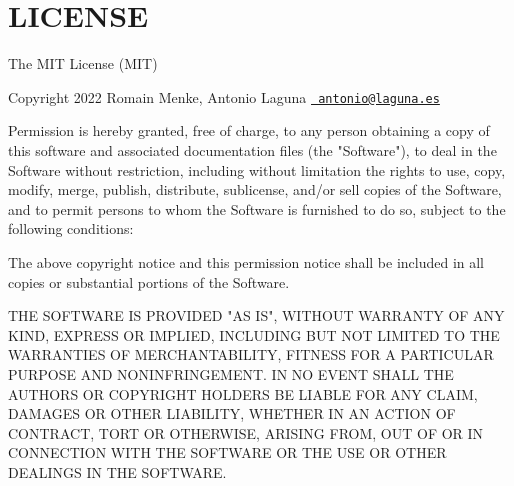 \chapter{LICENSE}
\hypertarget{md_node__modules_2_0dcsstools_2css-calc_2_l_i_c_e_n_s_e}{}\label{md_node__modules_2_0dcsstools_2css-calc_2_l_i_c_e_n_s_e}
The MIT License (MIT)

Copyright 2022 Romain Menke, Antonio Laguna \href{mailto:antonio@laguna.es}{\texttt{ antonio@laguna.\+es}}

Permission is hereby granted, free of charge, to any person obtaining a copy of this software and associated documentation files (the "{}\+Software"{}), to deal in the Software without restriction, including without limitation the rights to use, copy, modify, merge, publish, distribute, sublicense, and/or sell copies of the Software, and to permit persons to whom the Software is furnished to do so, subject to the following conditions\+:

The above copyright notice and this permission notice shall be included in all copies or substantial portions of the Software.

THE SOFTWARE IS PROVIDED "{}\+AS IS"{}, WITHOUT WARRANTY OF ANY KIND, EXPRESS OR IMPLIED, INCLUDING BUT NOT LIMITED TO THE WARRANTIES OF MERCHANTABILITY, FITNESS FOR A PARTICULAR PURPOSE AND NONINFRINGEMENT. IN NO EVENT SHALL THE AUTHORS OR COPYRIGHT HOLDERS BE LIABLE FOR ANY CLAIM, DAMAGES OR OTHER LIABILITY, WHETHER IN AN ACTION OF CONTRACT, TORT OR OTHERWISE, ARISING FROM, OUT OF OR IN CONNECTION WITH THE SOFTWARE OR THE USE OR OTHER DEALINGS IN THE SOFTWARE. 